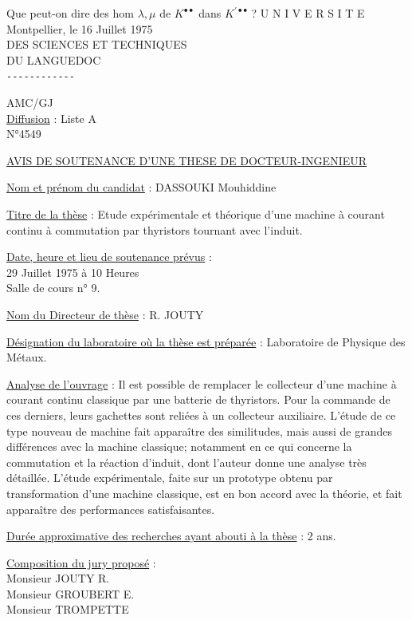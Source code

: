 Que peut-on dire des hom $\lambda,\mu$ de $K^{\bullet\bullet}$ dans $K^{\prime\bullet\bullet}$ ?
U N I V E R S I T E \hfill Montpellier, le 16 Juillet 1975\\
DES SCIENCES ET TECHNIQUES\\
DU LANGUEDOC\\
\texttt{-{}-{}-{}-{}-{}-{}-{}-{}-{}-{}-{}-}

AMC/GJ\\
\uline{Diffusion} : Liste A\\
N°4549

\uline{AVIS DE SOUTENANCE D'UNE THESE DE DOCTEUR-INGENIEUR}

\uline{Nom et prénom du candidat} : DASSOUKI Mouhiddine

\uline{Titre de la thèse} : Etude expérimentale et théorique d'une machine à courant continu à commutation par thyristors tournant avec l'induit.

\uline{Date, heure et lieu de soutenance prévus} :\\
29 Juillet 1975 à 10 Heures\\
Salle de cours n° 9.

\uline{Nom du Directeur de thèse} : R. JOUTY

\uline{Désignation du laboratoire où la thèse est préparée} : Laboratoire de Physique des Métaux.

\uline{Analyse de l'ouvrage} : Il est possible de remplacer le collecteur d'une machine à courant continu classique par une batterie de thyristors. Pour la commande de ces derniers, leurs gachettes sont reliées à un collecteur auxiliaire. L'étude de ce type nouveau de machine fait apparaître des similitudes, mais aussi de grandes différences avec la machine classique; notamment en ce qui concerne la commutation et la réaction d'induit, dont l'auteur donne une analyse très détaillée. L'étude expérimentale, faite sur un prototype obtenu par transformation d'une machine classique, est en bon accord avec la théorie, et fait apparaître des performances satisfaisantes.

\uline{Durée approximative des recherches ayant abouti à la thèse} : 2 ans.

\uline{Composition du jury proposé} :\\
Monsieur JOUTY R.\\
Monsieur GROUBERT E.\\
Monsieur TROMPETTE

